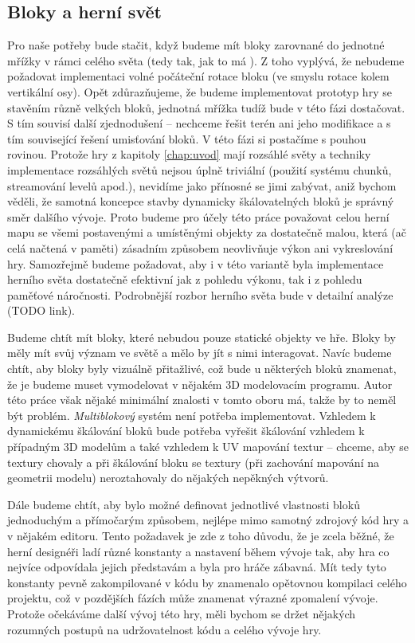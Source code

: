 
\subsection{Bloky a herní svět}
\label{subsec:bloky}

Pro naše potřeby bude stačit, když budeme mít bloky zarovnané do jednotné mřížky v rámci celého světa (tedy tak, jak to má \MC{}). Z toho vyplývá, že nebudeme požadovat implementaci volné počáteční rotace bloku (ve smyslu rotace kolem vertikální osy). Opět zdůrazňujeme, že budeme implementovat prototyp hry se stavěním různě velkých bloků, jednotná mřížka tudíž bude v této fázi dostačovat. S tím souvisí další zjednodušení -- nechceme řešit terén ani jeho modifikace a s tím související řešení umisťování bloků. V této fázi si postačíme s pouhou rovinou. Protože hry z kapitoly \ref{chap:uvod} mají rozsáhlé světy a techniky implementace rozsáhlých světů nejsou úplně triviální (použití systému chunků, streamování levelů apod.), nevidíme jako přínosné se jimi zabývat, aniž bychom věděli, že samotná koncepce stavby dynamicky škálovatelných bloků je správný směr dalšího vývoje. Proto budeme pro účely této práce považovat celou herní mapu se všemi postavenými a umístěnými objekty za dostatečně malou, která (ač celá načtená v paměti) zásadním způsobem neovlivňuje výkon ani vykreslování hry. Samozřejmě budeme požadovat, aby i v této variantě byla implementace herního světa dostatečně efektivní jak z pohledu výkonu, tak i z pohledu paměťové náročnosti. Podrobnější rozbor herního světa bude v detailní analýze (TODO link).

Budeme chtít mít bloky, které nebudou pouze statické objekty ve hře. Bloky by měly mít svůj význam ve světě a mělo by jít s nimi interagovat. Navíc budeme chtít, aby bloky byly vizuálně přitažlivé, což bude u některých bloků znamenat, že je budeme muset vymodelovat v nějakém 3D modelovacím programu. Autor této práce však nějaké minimální znalosti v tomto oboru má, takže by to neměl být problém. \textit{Multiblokový} systém není potřeba implementovat. Vzhledem k dynamickému škálování bloků bude potřeba vyřešit škálování vzhledem k případným 3D modelům a také vzhledem k UV mapování textur -- chceme, aby se textury chovaly  a při škálování bloku se textury (při zachování mapování na geometrii modelu) neroztahovaly do nějakých nepěkných výtvorů. 


Dále budeme chtít, aby bylo možné definovat jednotlivé vlastnosti bloků jednoduchým a přímočarým způsobem, nejlépe mimo samotný zdrojový kód hry a v nějakém editoru. Tento požadavek je zde z toho důvodu, že je zcela běžné, že herní designéři ladí různé konstanty a nastavení během vývoje tak, aby hra co nejvíce odpovídala jejich představám a byla pro hráče zábavná. Mít tedy tyto konstanty pevně zakompilované v kódu by znamenalo opětovnou kompilaci celého projektu, což v pozdějších fázích může znamenat výrazné zpomalení vývoje. Protože očekáváme další vývoj této hry, měli bychom se držet nějakých rozumných postupů na udržovatelnost kódu a celého vývoje hry.

